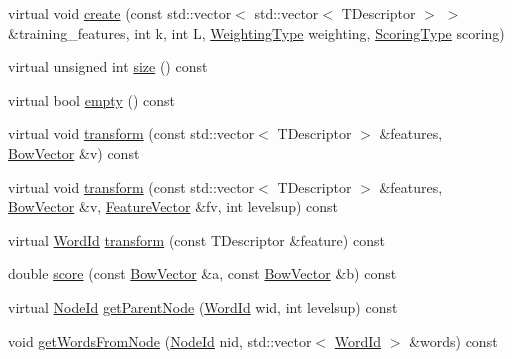 \begin{DoxyCompactItemize}
\item 
virtual void \mbox{\hyperlink{class_d_bo_w2_1_1_templated_vocabulary_a1e4a3e90f4aa1e6b6ea4d7491c223fd4}{create}} (const std\+::vector$<$ std\+::vector$<$ T\+Descriptor $>$ $>$ \&training\+\_\+features, int k, int L, \mbox{\hyperlink{namespace_d_bo_w2_a5de5c8a307aca9a84ffefda2a9bc467a}{Weighting\+Type}} weighting, \mbox{\hyperlink{namespace_d_bo_w2_aa252a592dd607c6e60dede06ceef2722}{Scoring\+Type}} scoring)
\item 
virtual unsigned int \mbox{\hyperlink{class_d_bo_w2_1_1_templated_vocabulary_a8baad280d6daf74ee43d7cd911363137}{size}} () const
\item 
virtual bool \mbox{\hyperlink{class_d_bo_w2_1_1_templated_vocabulary_ad7bbb3cf53f8f9f3610b9b67c551ba8e}{empty}} () const
\item 
virtual void \mbox{\hyperlink{class_d_bo_w2_1_1_templated_vocabulary_a01de3bebec37624439c7d3baf6651ff0}{transform}} (const std\+::vector$<$ T\+Descriptor $>$ \&features, \mbox{\hyperlink{class_d_bo_w2_1_1_bow_vector}{Bow\+Vector}} \&v) const
\item 
virtual void \mbox{\hyperlink{class_d_bo_w2_1_1_templated_vocabulary_af3815440ed610974afc5a2836f54fe07}{transform}} (const std\+::vector$<$ T\+Descriptor $>$ \&features, \mbox{\hyperlink{class_d_bo_w2_1_1_bow_vector}{Bow\+Vector}} \&v, \mbox{\hyperlink{class_d_bo_w2_1_1_feature_vector}{Feature\+Vector}} \&fv, int levelsup) const
\item 
virtual \mbox{\hyperlink{namespace_d_bo_w2_ab1a0d3283b2d4690a383372ed20bfeb5}{Word\+Id}} \mbox{\hyperlink{class_d_bo_w2_1_1_templated_vocabulary_aa5003af19aacb6a322f7fdc0535eb149}{transform}} (const T\+Descriptor \&feature) const
\item 
double \mbox{\hyperlink{class_d_bo_w2_1_1_templated_vocabulary_aedde9cc3255e41fd0441055eeb640346}{score}} (const \mbox{\hyperlink{class_d_bo_w2_1_1_bow_vector}{Bow\+Vector}} \&a, const \mbox{\hyperlink{class_d_bo_w2_1_1_bow_vector}{Bow\+Vector}} \&b) const
\item 
virtual \mbox{\hyperlink{namespace_d_bo_w2_a3a0fa9c50c0df508759362d6204566f2}{Node\+Id}} \mbox{\hyperlink{class_d_bo_w2_1_1_templated_vocabulary_a03912634600711fbf70355ed32b07f2c}{get\+Parent\+Node}} (\mbox{\hyperlink{namespace_d_bo_w2_ab1a0d3283b2d4690a383372ed20bfeb5}{Word\+Id}} wid, int levelsup) const
\item 
void \mbox{\hyperlink{class_d_bo_w2_1_1_templated_vocabulary_a809f881020a2b953664b1f528828551e}{get\+Words\+From\+Node}} (\mbox{\hyperlink{namespace_d_bo_w2_a3a0fa9c50c0df508759362d6204566f2}{Node\+Id}} nid, std\+::vector$<$ \mbox{\hyperlink{namespace_d_bo_w2_ab1a0d3283b2d4690a383372ed20bfeb5}{Word\+Id}} $>$ \&words) const

\end{DoxyCompactItemize}

